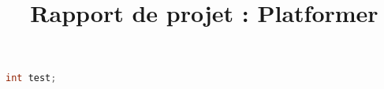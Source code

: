 \documentclass[12pt]{article}
\title{Rapport de projet : Platformer}
\begin{document}
\maketitle

	\begin{lstlisting}[language=C, title={Programme en C}]
		int test;
	\end{lstlisting}
	
\end{document}

